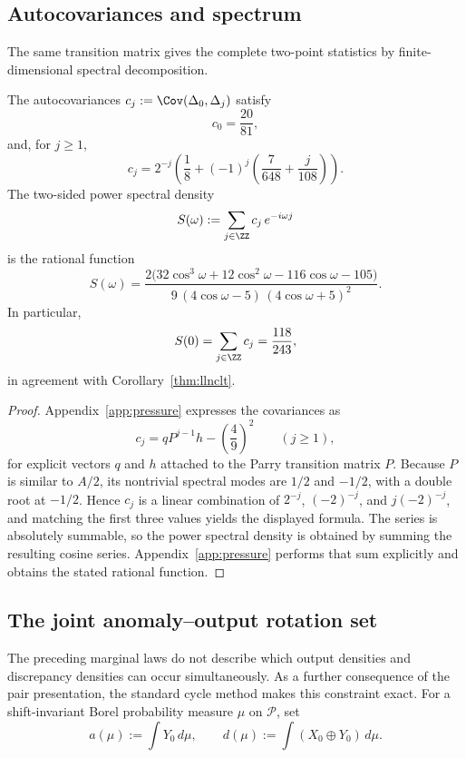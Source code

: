 \subsection{Autocovariances and spectrum}
\label{subsec:spectrum}

The same transition matrix gives the complete two-point statistics by finite-dimensional spectral decomposition.

\begin{theorem}\label{thm:spectrum}
The autocovariances \(c_j:=\Cov(\Delta_0,\Delta_j)\) satisfy
\[
c_0=\frac{20}{81},
\]
and, for \(j\ge 1\),
\[
c_j=2^{-j}\!\left(\frac{1}{8}+(-1)^j\!\left(\frac{7}{648}+\frac{j}{108}\right)\right).
\]
The two-sided power spectral density
\[
S(\omega):=\sum_{j\in \ZZ} c_j\,e^{-i\omega j}
\]
is the rational function
\[
S(\omega)
=
\frac{2\bigl(32\cos^3\omega+12\cos^2\omega-116\cos\omega-105\bigr)}
{9\,(4\cos\omega-5)\,(4\cos\omega+5)^2}.
\]
In particular,
\[
S(0)=\sum_{j\in\ZZ} c_j=\frac{118}{243},
\]
in agreement with Corollary~\ref{thm:llnclt}.
\end{theorem}

\begin{proof}
Appendix~\ref{app:pressure} expresses the covariances as
\[
c_j=qP^{j-1}h-\left(\frac49\right)^2\qquad (j\ge1),
\]
for explicit vectors \(q\) and \(h\) attached to the Parry transition matrix \(P\). Because \(P\) is similar to \(A/2\), its nontrivial spectral modes are \(1/2\) and \(-1/2\), with a double root at \(-1/2\). Hence \(c_j\) is a linear combination of \(2^{-j}\), \((-2)^{-j}\), and \(j(-2)^{-j}\), and matching the first three values yields the displayed formula. The series is absolutely summable, so the power spectral density is obtained by summing the resulting cosine series. Appendix~\ref{app:pressure} performs that sum explicitly and obtains the stated rational function.
\end{proof}


\subsection{The joint anomaly--output rotation set}
\label{subsec:joint-rotation}

The preceding marginal laws do not describe which output densities and
discrepancy densities can occur simultaneously. As a further consequence of
the pair presentation, the standard cycle method makes this constraint exact.
For a shift-invariant Borel probability measure
\(\mu\) on \(\mathcal P\), set
\[
a(\mu):=\int Y_0\,d\mu,
\qquad
d(\mu):=\int (X_0\oplus Y_0)\,d\mu.
\]

